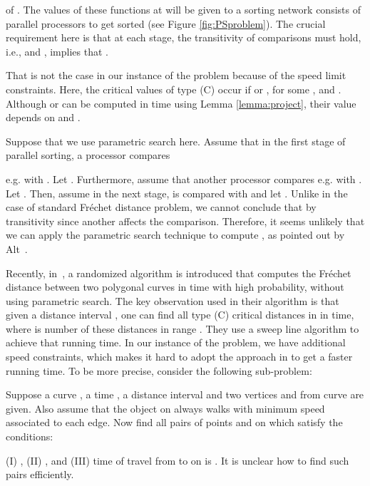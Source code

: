 \documentclass[12pt]{dalthesis}
\newcommand{\REM}[1]{}
\newcommand{\Frechet}{Fr\'echet }
\begin{document}
of . The values of these functions at 
 will be given to a sorting network 
consists of parallel processors to get sorted (see Figure \ref{fig:PSproblem}).  
The crucial  requirement here is 
that at each stage,  
the transitivity of comparisons must hold, 
i.e.,  
and , implies that
. 


That is not the case in our instance of the problem
because of the speed limit constraints.
Here, the critical values of type (C) occur if 
 or , 
for some , and . 
Although  or 
can be computed in  time
using Lemma \ref{lemma:project}, 
their value depends on   and . 

Suppose that we use parametric search here. 
Assume that in the first stage of
parallel sorting, 
a processor compares
\REM{
e.g.  with . 
Let . 
Furthermore, assume that another processor compares e.g.
 with .
Let . 
Then, assume in the next stage, 
 is compared with  and 
let .
Unlike in the case of standard \Frechet distance problem, 
we cannot conclude that  
}
e.g.  with . 
Let . 
Furthermore, assume that another processor compares e.g.
 with .
Let . 
Then, assume in the next stage, 
 is compared with  and 
let .
Unlike in the case of standard \Frechet distance problem, 
we cannot conclude that  
by transitivity since 
another  affects 
the comparison. Therefore, it seems unlikely that we can 
apply the parametric search technique
to compute , as pointed out by Alt~\cite{AltFinal}.


Recently, in~\cite{HarPeled11}, 
a  randomized algorithm is introduced that computes 
the \Frechet distance between two polygonal curves in  
time with high probability, without using parametric search.
The key observation used in their algorithm is that
given a distance interval , one can
find all type (C) critical distances in  in
 time, where  is number of these distances in range .
They use a sweep line algorithm to achieve that running time.
In our instance of the problem, we have additional speed constraints, 
which makes it  hard to adopt the approach in \cite{HarPeled11}
to get a faster running time.
To be more precise,  consider the following sub-problem:

Suppose a curve , a time , a distance interval  
and two vertices  and  from curve  are given. 
Also assume that the object on  always walks 
with minimum speed associated to each edge. 
Now find all pairs of points  and  on  which satisfy the conditions:

(I) ,  (II) , and 
(III) time of travel from  to  on  is .
It is unclear how to find such pairs efficiently. 
\end{document}
